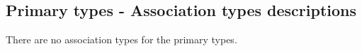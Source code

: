 \subsection{Primary types - Association types descriptions}



There are no association types for the primary types.


